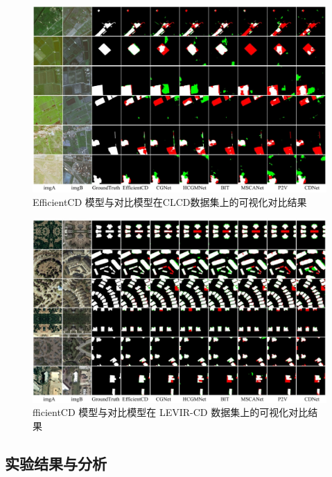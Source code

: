 \begin{figure}[!htbp]
  \centering
  \includegraphics[width=\textwidth]{paper_figures/基于双时相遥感影像特征交互的变化检测算法研究/EfficientCD/efficientcd_clcd.png}
  \caption{EfficientCD 模型与对比模型在CLCD数据集上的可视化对比结果}
  \label{fig:efficientcd_clcd}
\end{figure}

\begin{figure}[!htbp]
  \centering
  \includegraphics[width=\textwidth]{paper_figures/基于双时相遥感影像特征交互的变化检测算法研究/EfficientCD/efficientcd_levir.png}
  \caption{fficientCD 模型与对比模型在 LEVIR-CD 数据集上的可视化对比结果}
  \label{fig:efficientcd_levir}
\end{figure}

\subsection{实验结果与分析}



